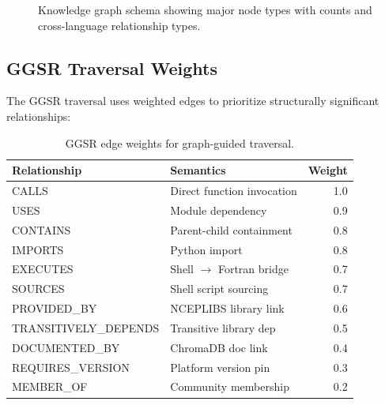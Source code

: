 \documentclass[11pt,letterpaper]{article}
\begin{document}
\begin{figure}[H]
\caption{Knowledge graph schema showing major node types with counts and
cross-language relationship types.}
\label{fig:graph-schema}
\end{figure}

\subsection{GGSR Traversal Weights}

The GGSR traversal uses weighted edges to prioritize structurally
significant relationships:

\begin{table}[H]
\centering
\footnotesize
\begin{tabular}{@{}llr@{}}
\toprule
\textbf{Relationship} & \textbf{Semantics} & \textbf{Weight} \\
\midrule
CALLS & Direct function invocation & 1.0 \\
USES & Module dependency & 0.9 \\
CONTAINS & Parent-child containment & 0.8 \\
IMPORTS & Python import & 0.8 \\
EXECUTES & Shell $\rightarrow$ Fortran bridge & 0.7 \\
SOURCES & Shell script sourcing & 0.7 \\
PROVIDED\_BY & NCEPLIBS library link & 0.6 \\
TRANSITIVELY\_DEPENDS & Transitive library dep & 0.5 \\
DOCUMENTED\_BY & ChromaDB doc link & 0.4 \\
REQUIRES\_VERSION & Platform version pin & 0.3 \\
MEMBER\_OF & Community membership & 0.2 \\
\bottomrule
\end{tabular}
\caption{GGSR edge weights for graph-guided traversal.}
\label{tab:ggsr-weights}
\end{table}
\end{document}
